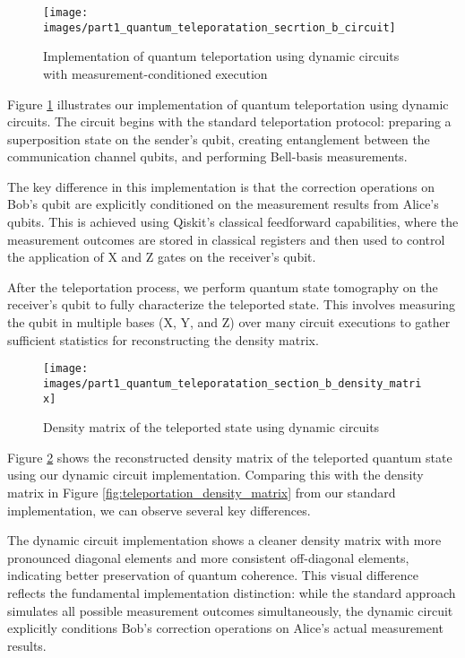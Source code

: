 \documentclass[12pt,a4paper]{article}
\begin{document}
\begin{figure}[h]
\centering
\texttt{[image: images/part1\_quantum\_teleporatation\_secrtion\_b\_circuit]}
\caption{Implementation of quantum teleportation using dynamic circuits with measurement-conditioned execution}
\label{fig:teleportation_dynamic_circuit}
\end{figure}

Figure \ref{fig:teleportation_dynamic_circuit} illustrates our implementation of quantum teleportation using dynamic circuits. The circuit begins with the standard teleportation protocol: preparing a superposition state on the sender's qubit, creating entanglement between the communication channel qubits, and performing Bell-basis measurements.

The key difference in this implementation is that the correction operations on Bob's qubit are explicitly conditioned on the measurement results from Alice's qubits. This is achieved using Qiskit's classical feedforward capabilities, where the measurement outcomes are stored in classical registers and then used to control the application of X and Z gates on the receiver's qubit.

After the teleportation process, we perform quantum state tomography on the receiver's qubit to fully characterize the teleported state. This involves measuring the qubit in multiple bases (X, Y, and Z) over many circuit executions to gather sufficient statistics for reconstructing the density matrix.

\begin{figure}[h]
\centering
\texttt{[image: images/part1\_quantum\_teleporatation\_section\_b\_density\_matrix]}
\caption{Density matrix of the teleported state using dynamic circuits}
\label{fig:teleportation_dynamic_density_matrix}
\end{figure}

Figure \ref{fig:teleportation_dynamic_density_matrix} shows the reconstructed density matrix of the teleported quantum state using our dynamic circuit implementation. Comparing this with the density matrix in Figure \ref{fig:teleportation_density_matrix} from our standard implementation, we can observe several key differences.

The dynamic circuit implementation shows a cleaner density matrix with more pronounced diagonal elements and more consistent off-diagonal elements, indicating better preservation of quantum coherence. This visual difference reflects the fundamental implementation distinction: while the standard approach simulates all possible measurement outcomes simultaneously, the dynamic circuit explicitly conditions Bob's correction operations on Alice's actual measurement results.
\end{document}
